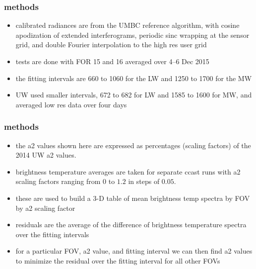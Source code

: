\documentclass[11pt]{beamer}
\begin{document}
\begin{frame}
\frametitle{methods}

\begin{itemize}

  \item calibrated radiances are from the UMBC {\ccast} reference
    algorithm, with cosine apodization of extended interferograms,
    periodic sinc wrapping at the sensor grid, and double Fourier
    interpolation to the high res user grid

  \item tests are done with FOR 15 and 16 averaged over 4--6 Dec
    2015

  \item the fitting intervals are 660 to 1060 {\wn} for the LW and
    1250 to 1700 {\wn} for the MW

  \item UW used smaller intervals, 672 to 682 {\wn} for LW and 1585
    to 1600 {\wn} for MW, and averaged low res data over four days

\end{itemize}

\end{frame}
\begin{frame}
\frametitle{methods}

\begin{itemize}

  \item the a2 values shown here are expressed as percentages
    (scaling factors) of the 2014 UW a2 values.

  \item brightness temperature averages are taken for separate ccast
    runs with a2 scaling factors ranging from 0 to $1.2$ in steps of
    $0.05$.

  \item these are used to build a 3-D table of mean brightness temp
    spectra by FOV by a2 scaling factor

  \item residuals are the {\rms} average of the difference of
    brightness temperature spectra over the fitting intervals

  \item for a particular FOV, a2 value, and fitting interval we can
    then find a2 values to minimize the residual over the fitting
    interval for all other FOVs

\end{itemize}

\end{frame}
\end{document}
